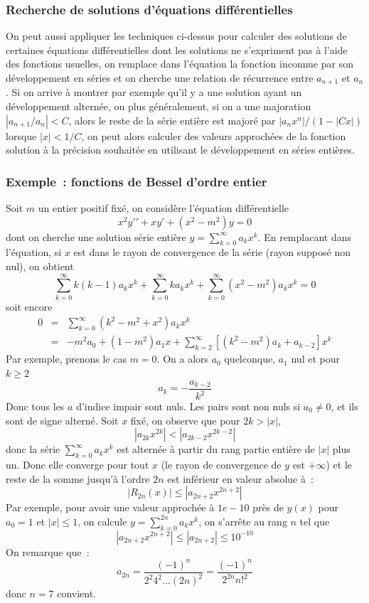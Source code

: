 \documentclass[a4paper,11pt]{article}
\begin{document}
\subsubsection{Recherche de solutions d'\'equations diff\'erentielles}
On peut aussi appliquer les techniques ci-dessus pour calculer
des solutions de certaines \'equations diff\'erentielles dont les
solutions ne s'expriment pas \`a l'aide des fonctions usuelles,
on remplace dans l'\'equation la fonction inconnue par son 
d\'eveloppement en s\'eries et on cherche une relation de r\'ecurrence
entre $a_{n+1}$ et $a_n$. Si on arrive \`a montrer par exemple
qu'il y a une solution ayant un d\'eveloppement altern\'ee, 
ou plus g\'en\'eralement,
si on a une majoration $|a_{n+1}/a_n|<C$, alors le reste de la
s\'erie enti\`ere est major\'e par $|a_nx^n|/(1-|Cx|)$ lorsque
$|x|<1/C$, on peut alors calculer des valeurs approch\'ees
de la fonction solution \`a la pr\'ecision souhait\'ee en utilisant
le d\'eveloppement en s\'eries enti\`eres.

\subsubsection{Exemple~: fonctions de Bessel d'ordre entier}
Soit $m$ un entier positif fix\'e, on consid\`ere l'\'equation
diff\'erentielle
\[ x^2 y'{'} + x y' + (x^2-m^2)y=0 \]
dont on cherche une solution s\'erie enti\`ere 
$y=\sum_{k=0}^\infty a_k x^k $. En remplacant dans l'\'equation, si
$x$ est dans le rayon de convergence de la s\'erie (rayon suppos\'e
non nul), on obtient
\[ 
\sum_{k=0}^\infty k(k-1)a_k x^k + \sum_{k=0}^\infty k a_k x^k 
+ \sum_{k=0}^\infty (x^2-m^2) a_k x^k =0
\]
soit encore
\begin{eqnarray*}
0 &=& \sum_{k=0}^\infty (k^2-m^2+x^2) a_k x^k  \\
 &=& -m^2 a_0 + (1-m^2)a_1 x + \sum_{k=2}^\infty [(k^2-m^2) a_k +a_{k-2}]x^k 
\end{eqnarray*}
Par exemple, prenons le cas $m=0$. On a alors $a_0$ quelconque, $a_1$
nul et pour $k\geq 2$
\[ a_k = - \frac{a_{k-2}}{k^2}\]
Donc tous les $a$ d'indice impair sont nuls. Les pairs sont non nuls
si $a_0\neq 0$, et ils sont de signe altern\'e.
Soit $x$ fix\'e, on observe que pour $2k > |x|$,
\[ |a_{2k} x^{2k}| < |a_{2k-2} x^{2k-2}| \]
donc la s\'erie $\sum_{k=0}^\infty a_k x^k$ est altern\'ee \`a partir
du rang partie enti\`ere de $|x|$ plus un. Donc elle converge pour
tout $x$ (le rayon de convergence de $y$ est $+\infty$) 
et le reste de la somme jusqu'\`a l'ordre $2n$ est
inf\'erieur en valeur absolue \`a~:
\[ |R_{2n}(x)| \leq |a_{2n+2} x^{2n+2}| \]
Par exemple, pour avoir une valeur approch\'ee \`a $1e-10$ pr\`es de
$y(x)$ pour $a_0=1$ et $|x|\leq 1$, on calcule $y=\sum_{k=0}^{2n} a_k x^k $,
on s'arr\^ete au rang $n$ tel que 
\[ |a_{2n+2} x^{2n+2}| \leq |a_{2n+2}| \leq 10^{-10} \]
On remarque que~:
\[ a_{2n} = \frac{(-1)^n}{2^2 4^2 ... (2n)^2} = \frac{(-1)^n}{2^{2n} n!^2} \]
donc $n=7$ convient.
\end{document}
